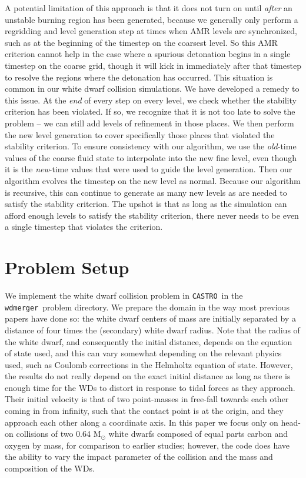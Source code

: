 \documentclass[twocolumn,numberedappendix]{../aastex6}
\newcommand{\msolar}{\mathrm{M}_\odot}
\newcommand{\castro}{\texttt{CASTRO}}
\newcommand{\wdmerger}{\texttt{wdmerger}}
\begin{document}
A potential limitation of this approach is that it does not turn on
until \textit{after} an unstable burning region has been generated,
because we generally only perform a regridding and level generation
step at times when AMR levels are synchronized, such as at the beginning
of the timestep on the coarsest level. So this AMR criterion cannot
help in the case where a spurious detonation begins in a single timestep
on the coarse grid, though it will kick in immediately after that
timestep to resolve the regions where the detonation has occurred.
This situation is common in our white dwarf collision simulations.
We have developed a remedy to this issue. At the \textit{end} of every step
on every level, we check whether the stability criterion has been violated.
If so, we recognize that it is not too late to solve the problem -- we can
still add levels of refinement in those places. We then perform the new level
generation to cover specifically those places that violated the stability criterion.
To ensure consistency with our algorithm, we use the \textit{old}-time values
of the coarse fluid state to interpolate into the new fine level, even
though it is the \textit{new}-time values that were used to guide the level
generation. Then our algorithm evolves the timestep on the new level as normal.
Because our algorithm is recursive, this can continue to generate
as many new levels as are needed to satisfy the stability criterion.
The upshot is that as long as the simulation can afford enough levels to
satisfy the stability criterion, there never needs to be even a single timestep
that violates the criterion.



\section{Problem Setup}
\label{sec:problemsetup}

We implement the white dwarf collision problem in \castro\ in the \wdmerger\ problem
directory. We prepare the domain in the way most previous papers have done so:
the white dwarf centers of mass are initially separated by a distance of four times
the (secondary) white dwarf radius. Note that the radius of the white dwarf, and
consequently the initial distance, depends on the equation of state used, and this
can vary somewhat depending on the relevant physics used, such as Coulomb corrections
in the Helmholtz equation of state. However, the results do not really depend on the
exact initial distance as long as there is enough time for the WDs to distort in
response to tidal forces as they approach. Their initial velocity is that of
two point-masses in free-fall towards each other coming in from infinity, such that
the contact point is at the origin, and they approach each other along a coordinate axis.
In this paper we focus only on head-on collisions of two 0.64 $\msolar$ white dwarfs
composed of equal parts carbon and oxygen by mass, for comparison to earlier studies;
however, the code does have the ability to vary the impact parameter of the collision
and the mass and composition of the WDs.
\end{document}
